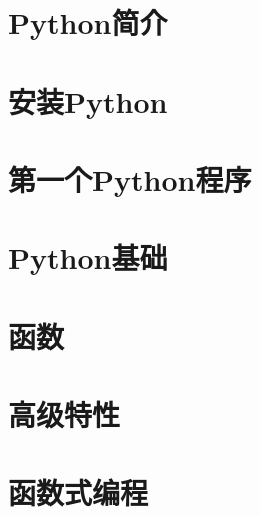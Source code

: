 \newpage
\section{Python简介}



\newpage
\section{安装Python}

\newpage



\newpage
\section{第一个Python程序}

\newpage

\newpage

\newpage



\newpage
\section{Python基础}

\newpage

\newpage

\newpage

\newpage

\newpage

\newpage



\newpage
\section{函数}

\newpage

\newpage

\newpage

\newpage



\newpage
\section{高级特性}

\newpage

\newpage

\newpage

\newpage

\newpage



\newpage
\section{函数式编程}

\newpage

\newpage

\newpage

\newpage

\newpage

\newpage

\newpage

\newpage



